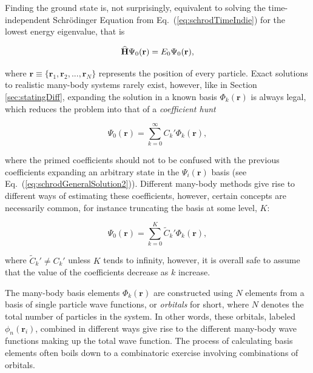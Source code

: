 Finding the ground state is, not surprisingly, equivalent to solving the time-independent Schrödinger Equation from Eq.~(\ref{eq:schrodTimeIndie}) for the lowest energy eigenvalue, that is

\begin{equation}
 {\bf\widehat{H}}\Psi_0(\mathbf{r}) = E_0\Psi_0(\mathbf{r}),
 \end{equation}
 
where $\mathbf{r} \equiv \{\mathbf{r}_1, \mathbf{r}_2, ..., \mathbf{r}_N\}$ represents the position of every particle. Exact solutions to realistic many-body systems rarely exist, however, like in Section \ref{sec:statingDiff}, expanding the solution in a known basis $\Phi_k(\mathbf{r})$ is always legal, which reduces the problem into that of a \textit{coefficient hunt} 

\begin{equation}
\label{eq:manyBodyExp}
 \Psi_0(\mathbf{r}) = \sum_{k=0}^\infty C_k'\Phi_k(\mathbf{r}),
\end{equation}

where the primed coefficients should not to be confused with the previous coefficients expanding an arbitrary state in the $\Psi_i(\mathbf{r})$ basis (see Eq.~(\ref{eq:schrodGeneralSolution2})). Different many-body methods give rise to different ways of estimating these coefficients, however, certain concepts are necessarily common, for instance truncating the basis at some level, $K$:

\begin{equation}
 \Psi_0(\mathbf{r}) = \sum_{k=0}^K \tilde{C}_k'\Phi_k(\mathbf{r}), \label{eq:manybodyWFexp}
\end{equation}

where $ \tilde{C}_k' \ne  C_k'$ unless $K$ tends to infinity, however, it is overall safe to assume that the value of the coefficients decrease as $k$ increase. 

The many-body basis elements $\Phi_k(\mathbf{r})$ are constructed using $N$ elements from a basis of single particle wave functions, or \textit{orbitals} for short, where $N$ denotes the total number of particles in the system. In other words, these orbitals, labeled $\phi_n(\mathbf{r}_i)$, combined in different ways give rise to the different many-body wave functions making up the total wave function. The process of calculating basis elements often boils down to a combinatoric exercise involving combinations of orbitals.


